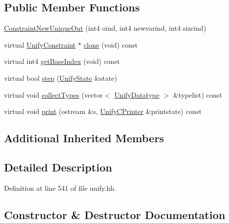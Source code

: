 \subsection*{Public Member Functions}
\begin{DoxyCompactItemize}
\item 
\mbox{\hyperlink{class_constraint_new_unique_out_a2dd7fe7d8a581f94c2894050183844a0}{Constraint\+New\+Unique\+Out}} (int4 oind, int4 newvarind, int4 sizeind)
\item 
virtual \mbox{\hyperlink{class_unify_constraint}{Unify\+Constraint}} $\ast$ \mbox{\hyperlink{class_constraint_new_unique_out_a5c430b42eee12168f0e542f4be6e766b}{clone}} (void) const
\item 
virtual int4 \mbox{\hyperlink{class_constraint_new_unique_out_abf3ec86b9b2f5317794ab6ba261a66d1}{get\+Base\+Index}} (void) const
\item 
virtual bool \mbox{\hyperlink{class_constraint_new_unique_out_a164256b52634fe6d5a858a601845dfe5}{step}} (\mbox{\hyperlink{class_unify_state}{Unify\+State}} \&state)
\item 
virtual void \mbox{\hyperlink{class_constraint_new_unique_out_aec54f3b89aea6c13fedc58815db4745f}{collect\+Types}} (vector$<$ \mbox{\hyperlink{class_unify_datatype}{Unify\+Datatype}} $>$ \&typelist) const
\item 
virtual void \mbox{\hyperlink{class_constraint_new_unique_out_a256e1cdd4cfb6d3bcc2bba2699d9d44c}{print}} (ostream \&s, \mbox{\hyperlink{class_unify_c_printer}{Unify\+C\+Printer}} \&printstate) const
\end{DoxyCompactItemize}
\subsection*{Additional Inherited Members}


\subsection{Detailed Description}


Definition at line 541 of file unify.\+hh.



\subsection{Constructor \& Destructor Documentation}
\mbox{\label{class_constraint_new_unique_out_a2dd7fe7d8a581f94c2894050183844a0}} 
